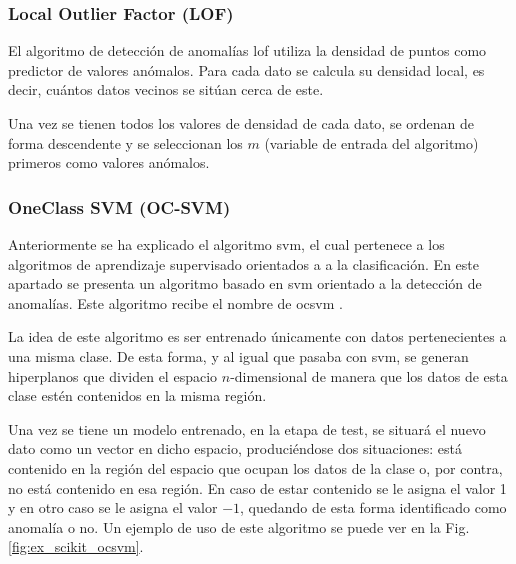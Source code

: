 \subsubsection{Local Outlier Factor (LOF)}

El algoritmo de detección de anomalías \acrfull{lof} \cite{cheng2019outlier} utiliza la densidad de puntos como predictor de valores anómalos. Para cada dato se calcula su densidad local, es decir, cuántos datos vecinos se sitúan cerca de este.

Una vez se tienen todos los valores de densidad de cada dato, se ordenan de forma descendente y se seleccionan los $m$ (variable de entrada del algoritmo) primeros como valores anómalos.

\subsubsection{OneClass SVM (OC-SVM)}

Anteriormente se ha explicado el algoritmo \acrshort{svm}, el cual pertenece a los algoritmos de aprendizaje supervisado orientados a a la clasificación. En este apartado se presenta un algoritmo basado en \acrshort{svm} orientado a la detección de anomalías. Este algoritmo recibe el nombre de \acrfull{ocsvm} \cite{li2003improving}.

La idea de este algoritmo es ser entrenado únicamente con datos pertenecientes a una misma clase. De esta forma, y al igual que pasaba con \acrshort{svm}, se generan hiperplanos que dividen el espacio $n$-dimensional de manera que los datos de esta clase estén contenidos en la misma región. 

Una vez se tiene un modelo entrenado, en la etapa de test, se situará el nuevo dato como un vector en dicho espacio, produciéndose dos situaciones: está contenido en la región del espacio que ocupan los datos de la clase o, por contra, no está contenido en esa región. En caso de estar contenido se le asigna el valor 1 y en otro caso se le asigna el valor $-1$, quedando de esta forma identificado como anomalía o no. Un ejemplo de uso de este algoritmo se puede ver en la Fig. \ref{fig:ex_scikit_ocsvm}.

